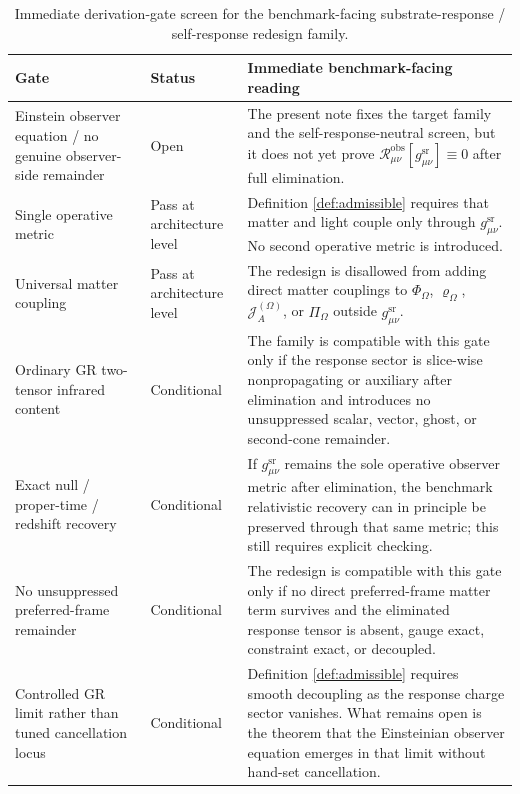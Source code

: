 \documentclass[11pt]{article}
\newcommand{\RedesignMetric}{g_{\mu\nu}^{\mathrm{sr}}}
\newcommand{\ObserverRem}{\mathcal R_{\mu\nu}^{\mathrm{obs}}}
\newcommand{\SourceDensity}{\varrho_\Omega}
\newcommand{\SourceCurrent}{\mathcal J^{(\Omega)}}
\newcommand{\FlowPot}{\Phi_\Omega}
\newcommand{\BalanceField}{\Pi_\Omega}
\begin{document}
\begin{table}[t]
\centering
\renewcommand{\arraystretch}{1.22}
\begin{tabular}{p{}p{}p{}}
\toprule
\textbf{Gate} & \textbf{Status} & \textbf{Immediate benchmark-facing reading} \\
\midrule
Einstein observer equation / no genuine observer-side remainder & Open & The present note fixes the target family and the self-response-neutral screen, but it does not yet prove \(\ObserverRem[\RedesignMetric]\equiv 0\) after full elimination. \\
Single operative metric & Pass at architecture level & Definition \ref{def:admissible} requires that matter and light couple only through \(\RedesignMetric\). No second operative metric is introduced. \\
Universal matter coupling & Pass at architecture level & The redesign is disallowed from adding direct matter couplings to \(\FlowPot\), \(\SourceDensity\), \(\SourceCurrent_A\), or \(\BalanceField\) outside \(\RedesignMetric\). \\
Ordinary GR two-tensor infrared content & Conditional & The family is compatible with this gate only if the response sector is slice-wise nonpropagating or auxiliary after elimination and introduces no unsuppressed scalar, vector, ghost, or second-cone remainder. \\
Exact null / proper-time / redshift recovery & Conditional & If \(\RedesignMetric\) remains the sole operative observer metric after elimination, the benchmark relativistic recovery can in principle be preserved through that same metric; this still requires explicit checking. \\
No unsuppressed preferred-frame remainder & Conditional & The redesign is compatible with this gate only if no direct preferred-frame matter term survives and the eliminated response tensor is absent, gauge exact, constraint exact, or decoupled. \\
Controlled GR limit rather than tuned cancellation locus & Conditional & Definition \ref{def:admissible} requires smooth decoupling as the response charge sector vanishes. What remains open is the theorem that the Einsteinian observer equation emerges in that limit without hand-set cancellation. \\
\bottomrule
\end{tabular}
\caption{Immediate derivation-gate screen for the benchmark-facing substrate-response / self-response redesign family.}
\label{tab:gates}
\end{table}
\end{document}
